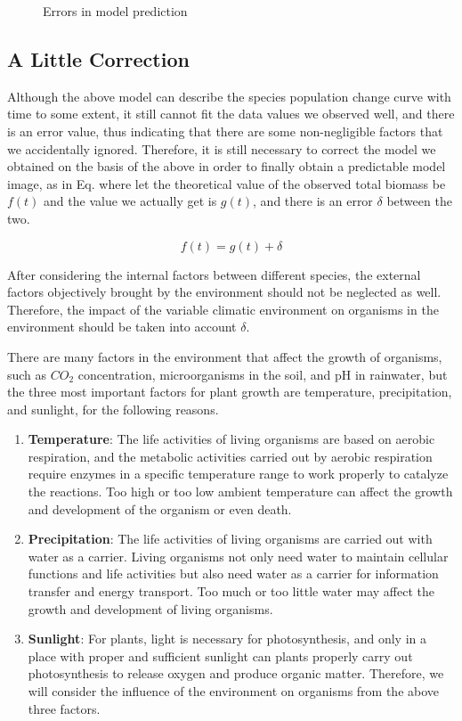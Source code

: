 \documentclass[12pt]{article}
\begin{document}
\begin{figure}[htb]
	\centering
	
	\caption{Errors in model prediction}
	\label{fig:error}
\end{figure}

\subsection{A Little Correction}

Although the above model can describe the species population change curve with time to some extent, it still cannot fit the data values we observed well, and there is an error value, thus indicating that there are some non-negligible factors that we accidentally ignored. Therefore, it is still necessary to correct the model we obtained on the basis of the above in order to finally obtain a predictable model image, as in Eq. where let the theoretical value of the observed total biomass be $f(t)$ and the value we actually get is $g(t)$, and there is an error $\delta$ between the two.

\begin{equation}
	f(t) = g(t) + \delta
\end{equation}

After considering the internal factors between different species, the external factors objectively brought by the environment should not be neglected as well. Therefore, the impact of the variable climatic environment on organisms in the environment should be taken into account $\delta$.

There are many factors in the environment that affect the growth of organisms, such as $CO_2$ concentration, microorganisms in the soil, and pH in rainwater, but the three most important factors for plant growth are temperature, precipitation, and sunlight, for the following reasons.

\begin{enumerate}
	\item \textbf{Temperature}: The life activities of living organisms are based on aerobic respiration, and the metabolic activities carried out by aerobic respiration require enzymes in a specific temperature range to work properly to catalyze the reactions. Too high or too low ambient temperature can affect the growth and development of the organism or even death.
	\item \textbf{Precipitation}: The life activities of living organisms are carried out with water as a carrier. Living organisms not only need water to maintain cellular functions and life activities but also need water as a carrier for information transfer and energy transport. Too much or too little water may affect the growth and development of living organisms.
	\item \textbf{Sunlight}: For plants, light is necessary for photosynthesis, and only in a place with proper and sufficient sunlight can plants properly carry out photosynthesis to release oxygen and produce organic matter.
	      Therefore, we will consider the influence of the environment on organisms from the above three factors.
\end{enumerate}
\end{document}
